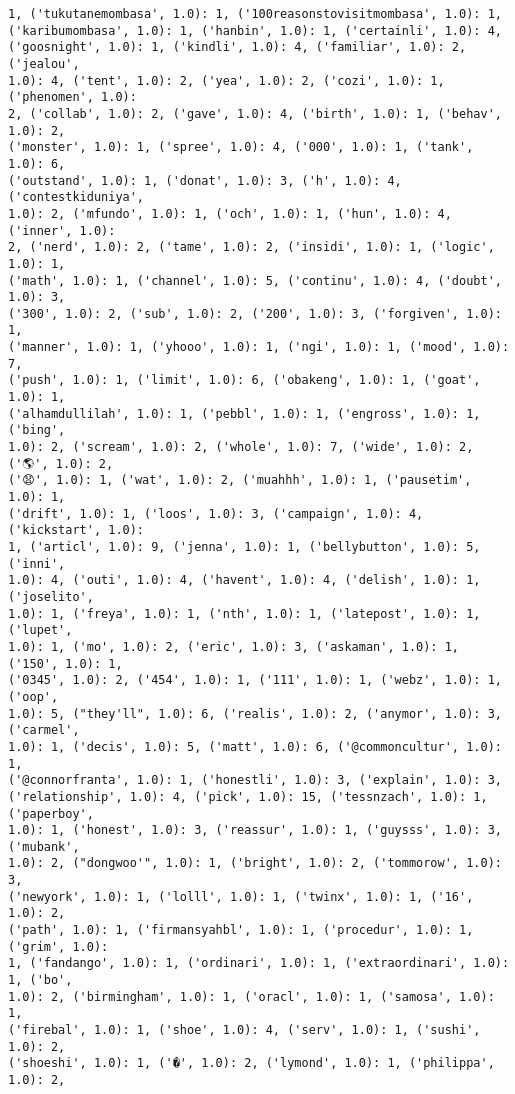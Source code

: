 \documentclass[11pt]{article}
\begin{document}
\begin{Verbatim}[commandchars=\\\{\}]
1, ('tukutanemombasa', 1.0): 1, ('100reasonstovisitmombasa', 1.0): 1,
('karibumombasa', 1.0): 1, ('hanbin', 1.0): 1, ('certainli', 1.0): 4,
('goosnight', 1.0): 1, ('kindli', 1.0): 4, ('familiar', 1.0): 2, ('jealou',
1.0): 4, ('tent', 1.0): 2, ('yea', 1.0): 2, ('cozi', 1.0): 1, ('phenomen', 1.0):
2, ('collab', 1.0): 2, ('gave', 1.0): 4, ('birth', 1.0): 1, ('behav', 1.0): 2,
('monster', 1.0): 1, ('spree', 1.0): 4, ('000', 1.0): 1, ('tank', 1.0): 6,
('outstand', 1.0): 1, ('donat', 1.0): 3, ('h', 1.0): 4, ('contestkiduniya',
1.0): 2, ('mfundo', 1.0): 1, ('och', 1.0): 1, ('hun', 1.0): 4, ('inner', 1.0):
2, ('nerd', 1.0): 2, ('tame', 1.0): 2, ('insidi', 1.0): 1, ('logic', 1.0): 1,
('math', 1.0): 1, ('channel', 1.0): 5, ('continu', 1.0): 4, ('doubt', 1.0): 3,
('300', 1.0): 2, ('sub', 1.0): 2, ('200', 1.0): 3, ('forgiven', 1.0): 1,
('manner', 1.0): 1, ('yhooo', 1.0): 1, ('ngi', 1.0): 1, ('mood', 1.0): 7,
('push', 1.0): 1, ('limit', 1.0): 6, ('obakeng', 1.0): 1, ('goat', 1.0): 1,
('alhamdullilah', 1.0): 1, ('pebbl', 1.0): 1, ('engross', 1.0): 1, ('bing',
1.0): 2, ('scream', 1.0): 2, ('whole', 1.0): 7, ('wide', 1.0): 2, ('🌎', 1.0): 2,
('😧', 1.0): 1, ('wat', 1.0): 2, ('muahhh', 1.0): 1, ('pausetim', 1.0): 1,
('drift', 1.0): 1, ('loos', 1.0): 3, ('campaign', 1.0): 4, ('kickstart', 1.0):
1, ('articl', 1.0): 9, ('jenna', 1.0): 1, ('bellybutton', 1.0): 5, ('inni',
1.0): 4, ('outi', 1.0): 4, ('havent', 1.0): 4, ('delish', 1.0): 1, ('joselito',
1.0): 1, ('freya', 1.0): 1, ('nth', 1.0): 1, ('latepost', 1.0): 1, ('lupet',
1.0): 1, ('mo', 1.0): 2, ('eric', 1.0): 3, ('askaman', 1.0): 1, ('150', 1.0): 1,
('0345', 1.0): 2, ('454', 1.0): 1, ('111', 1.0): 1, ('webz', 1.0): 1, ('oop',
1.0): 5, ("they'll", 1.0): 6, ('realis', 1.0): 2, ('anymor', 1.0): 3, ('carmel',
1.0): 1, ('decis', 1.0): 5, ('matt', 1.0): 6, ('@commoncultur', 1.0): 1,
('@connorfranta', 1.0): 1, ('honestli', 1.0): 3, ('explain', 1.0): 3,
('relationship', 1.0): 4, ('pick', 1.0): 15, ('tessnzach', 1.0): 1, ('paperboy',
1.0): 1, ('honest', 1.0): 3, ('reassur', 1.0): 1, ('guysss', 1.0): 3, ('mubank',
1.0): 2, ("dongwoo'", 1.0): 1, ('bright', 1.0): 2, ('tommorow', 1.0): 3,
('newyork', 1.0): 1, ('lolll', 1.0): 1, ('twinx', 1.0): 1, ('16', 1.0): 2,
('path', 1.0): 1, ('firmansyahbl', 1.0): 1, ('procedur', 1.0): 1, ('grim', 1.0):
1, ('fandango', 1.0): 1, ('ordinari', 1.0): 1, ('extraordinari', 1.0): 1, ('bo',
1.0): 2, ('birmingham', 1.0): 1, ('oracl', 1.0): 1, ('samosa', 1.0): 1,
('firebal', 1.0): 1, ('shoe', 1.0): 4, ('serv', 1.0): 1, ('sushi', 1.0): 2,
('shoeshi', 1.0): 1, ('�', 1.0): 2, ('lymond', 1.0): 1, ('philippa', 1.0): 2,

\end{Verbatim}
\end{document}
